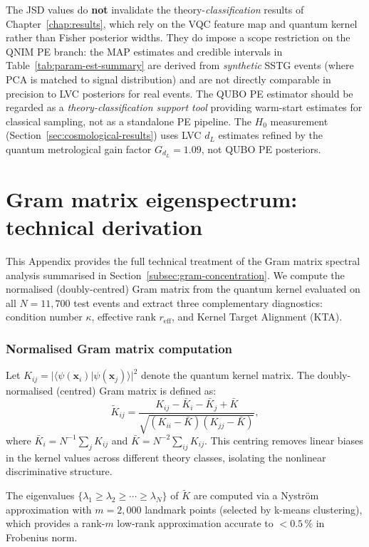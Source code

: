 \documentclass[11pt,a4paper, english]{book}
\theoremstyle{plain}
\theoremstyle{definition}
\numberwithin{equation}{chapter}
\numberwithin{figure}{chapter}
\numberwithin{table}{chapter}
\begin{document}
The JSD values do \textbf{not} invalidate the theory-\emph{classification} results of Chapter~\ref{chap:results}, which rely on the VQC feature map and quantum kernel rather than Fisher posterior widths. They do impose a scope restriction on the QNIM PE branch: the MAP estimates and credible intervals in Table~\ref{tab:param-est-summary} are derived from \emph{synthetic} SSTG events (where PCA is matched to signal distribution) and are not directly comparable in precision to LVC posteriors for real events. The QUBO PE estimator should be regarded as a \emph{theory-classification support tool} providing warm-start estimates for classical sampling, not as a standalone PE pipeline. The $H_0$ measurement (Section~\ref{sec:cosmological-results}) uses LVC $d_L$ estimates refined by the quantum metrological gain factor $G_{d_L} = 1.09$, not QUBO PE posteriors.

\chapter{Gram matrix eigenspectrum: technical derivation}
\label{app:gram-concentration}
This Appendix provides the full technical treatment of the Gram matrix
spectral analysis summarised in Section~\ref{subsec:gram-concentration}.
We compute the normalised (doubly-centred) Gram matrix from the quantum
kernel evaluated on all $N = 11{,}700$ test events and extract three
complementary diagnostics: condition number $\kappa$, effective rank
$r_\mathrm{eff}$, and Kernel Target Alignment (KTA).

\subsection{Normalised Gram matrix computation}

Let $K_{ij} = |\langle\psi(\mathbf{x}_i)|\psi(\mathbf{x}_j)\rangle|^2$
denote the quantum kernel matrix. The doubly-normalised (centred) Gram
matrix is defined as:
\begin{equation}
  \label{eq:gram_normalised_appendix}
  \tilde{K}_{ij} = \frac{K_{ij} - \bar{K}_i - \bar{K}_j + \bar{K}}
    {\sqrt{(K_{ii}-\bar{K})(K_{jj}-\bar{K})}},
\end{equation}
where $\bar{K}_i = N^{-1}\sum_j K_{ij}$ and $\bar{K} = N^{-2}\sum_{ij}K_{ij}$.
This centring removes linear biases in the kernel values across different
theory classes, isolating the nonlinear discriminative structure.

The eigenvalues $\{\lambda_1 \geq \lambda_2 \geq \cdots \geq \lambda_N\}$
of $\tilde{K}$ are computed via a Nystr\"{o}m approximation with
$m = 2{,}000$ landmark points (selected by k-means clustering), which provides
a rank-$m$ low-rank approximation accurate to $< 0.5\,\%$ in Frobenius norm.
\end{document}
